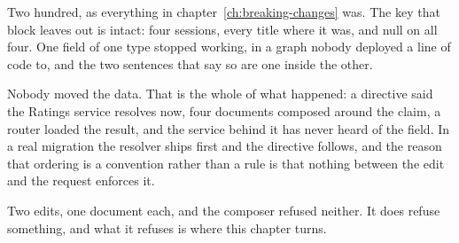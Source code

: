 %
Two hundred, as everything in chapter~\ref{ch:breaking-changes} was. The
 key that block leaves out is intact: four sessions, every title
where it was, and  null on all four. One field of one type
stopped working, in a graph nobody deployed a line of code to, and the two
sentences that say so are one inside the other.

%
Nobody moved the data. That is the whole of what happened: a directive said
the Ratings service resolves  now, four documents composed
around the claim, a router loaded the result, and the service behind it has
never heard of the field. In a real migration the resolver ships first and the
directive follows, and the reason that ordering is a convention rather than a
rule is that nothing between the edit and the request enforces it.

%
Two edits, one document each, and the composer refused neither. It does refuse
something, and what it refuses is where this chapter turns.
%
